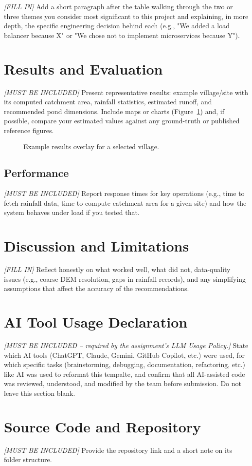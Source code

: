 \documentclass[manuscript,screen,review]{acmart}
\begin{document}
\textit{[FILL IN]} Add a short paragraph after the table walking
through the two or three themes you consider most significant to
this project and explaining, in more depth, the specific engineering
decision behind each (e.g., "We added a load balancer because X" or
"We chose not to implement microservices because Y").

\section{Results and Evaluation}
\label{sec:results}
\textit{[MUST BE INCLUDED]} Present representative results: example
village/site with its computed catchment area, rainfall statistics,
estimated runoff, and recommended pond dimensions. Include maps or
charts (Figure~\ref{fig:results}) and, if possible, compare your
estimated values against any ground-truth or published reference
figures.

\begin{figure}[h]
  \centering
  \caption{Example results overlay for a selected village.}
  \label{fig:results}
\end{figure}

\subsection{Performance}
\textit{[MUST BE INCLUDED]} Report response times for key operations (e.g.,
time to fetch rainfall data, time to compute catchment area for a
given site) and how the system behaves under load if you tested that.

\section{Discussion and Limitations}
\label{sec:discussion}
\textit{[FILL IN]} Reflect honestly on what worked well, what did
not, data-quality issues (e.g., coarse DEM resolution, gaps in
rainfall records), and any simplifying assumptions that affect the
accuracy of the recommendations.

\section{AI Tool Usage Declaration}
\label{sec:ai-usage}
\textit{[MUST BE INCLUDED -- required by the assignment's LLM Usage Policy.]}
State which AI tools (ChatGPT, Claude, Gemini, GitHub Copilot, etc.)
were used, for which specific tasks (brainstorming, debugging,
documentation, refactoring, etc.) like AI was used to reformat this tempalte, and confirm that all AI-assisted
code was reviewed, understood, and modified by the team before
submission. Do not leave this section blank.


\appendix

\section{Source Code and Repository}
\textit{[MUST BE INCLUDED]} Provide the repository link and a short note on
its folder structure.
\end{document}
